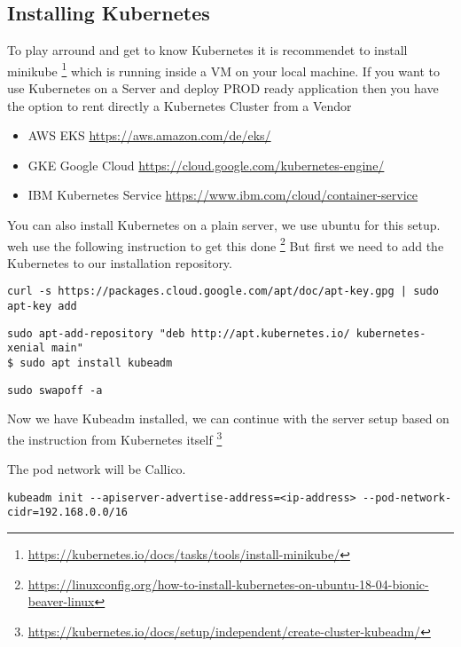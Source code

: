 \subsection{Installing Kubernetes}

To play arround and get to know Kubernetes it is recommendet to install minikube \footnote{\url{https://kubernetes.io/docs/tasks/tools/install-minikube/}} which is running inside a VM on your local machine.
If you want to use Kubernetes on a Server and deploy PROD ready application then you have the option to rent directly a Kubernetes Cluster from a Vendor
\begin{itemize}
\item AWS EKS \url{https://aws.amazon.com/de/eks/}
\item GKE Google Cloud \url{https://cloud.google.com/kubernetes-engine/}
\item IBM Kubernetes Service \url{https://www.ibm.com/cloud/container-service}
\end{itemize}

You can also install Kubernetes on a plain server, we use ubuntu for this setup. weh use the following instruction to get this done \footnote{\url{https://linuxconfig.org/how-to-install-kubernetes-on-ubuntu-18-04-bionic-beaver-linux}}
 But first we need to add the Kubernetes to our installation repository.
\begin{verbatim}
curl -s https://packages.cloud.google.com/apt/doc/apt-key.gpg | sudo apt-key add
\end{verbatim}

\begin{verbatim}
sudo apt-add-repository "deb http://apt.kubernetes.io/ kubernetes-xenial main"
$ sudo apt install kubeadm 
\end{verbatim}

\begin{verbatim}
sudo swapoff -a
\end{verbatim}

Now we have Kubeadm installed, we can continue with the server setup based on the instruction from Kubernetes itself \footnote{\url{https://kubernetes.io/docs/setup/independent/create-cluster-kubeadm/}}

The pod network will be Callico.

\begin{verbatim}
kubeadm init --apiserver-advertise-address=<ip-address> --pod-network-cidr=192.168.0.0/16
\end{verbatim}

